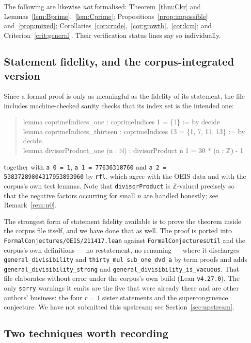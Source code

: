 \documentclass[11pt]{article}
\theoremstyle{plain}
\theoremstyle{definition}
\theoremstyle{remark}
\numberwithin{equation}{section}
\newcommand{\N}{\mathbb{N}}
\newcommand{\Z}{\mathbb{Z}}
\begin{document}
The following are likewise \emph{not} formalised: Theorem~\ref{thm:Ckr} and
Lemmas~\ref{lem:Bprime},~\ref{lem:Cprime}; Propositions~\ref{prop:impossible}
and~\ref{prop:mixed}; Corollaries~\ref{cor:crude},~\ref{cor:growth},~\ref{cor:lcm}; and
Criterion~\ref{crit:general}. Their verification status lines say so individually.

\subsection{Statement fidelity, and the corpus-integrated version}
\label{sec:fidelity}

Since a formal proof is only as meaningful as the fidelity of its statement, the file includes
machine-checked sanity checks that its index set is the intended one:
\begin{quote}\ttfamily\small
lemma coprimeIndices\_one : coprimeIndices 1 = \{1\} := by decide\\
lemma coprimeIndices\_thirteen : coprimeIndices 13 = \{1, 7, 11, 13\} := by decide\\
lemma divisorProduct\_one (n : $\N$) : divisorProduct n 1 = 30 * (n : $\Z$) - 1
\end{quote}
together with \texttt{a 0 = 1}, \texttt{a 1 = 77636318760} and
\texttt{a 2 = 53837289804317953893960} by \texttt{rfl}, which agree with the OEIS data and with
the corpus's own test lemmas. Note that \texttt{divisorProduct} is $\Z$-valued precisely so that
the negative factors occurring for small $n$ are handled honestly; see Remark~\ref{rem:n0}.

The strongest form of statement fidelity available is to prove the theorem inside the corpus file
itself, and we have done that as well. The proof is ported into
\texttt{FormalConjectures/OEIS/211417.lean} against \texttt{FormalConjecturesUtil} and the
corpus's own definitions --- no restatement, no renaming --- where it discharges
\texttt{general\_divisibility} and \texttt{thirty\_mul\_sub\_one\_dvd\_a} by term proofs and adds
\texttt{general\_divisibility\_strong} and \texttt{general\_divisibility\_is\_vacuous}. That file
elaborates without error under the corpus's own build (Lean \texttt{v4.27.0}). The only
\texttt{sorry} warnings it emits are the five that were already there and are other authors'
business: the four $r=1$ sister statements and the supercongruence conjecture. We have not
submitted this upstream; see Section~\ref{sec:upstream}.

\subsection{Two techniques worth recording}
\end{document}
